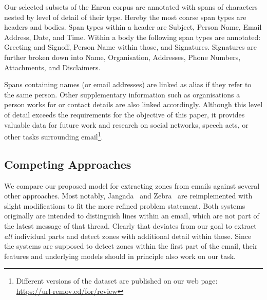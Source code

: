 \documentclass{llncs}
\begin{document}
Our selected subsets of the Enron corpus are annotated with spans of characters nested by level of detail of their type.
Hereby the most coarse span types are headers and bodies.
Span types within a header are Subject, Person Name, Email Address, Date, and Time.
Within a body the following span types are annotated: Greeting and Signoff, Person Name within those, and Signatures. Signatures are further broken down into Name, Organisation, Addresses, Phone Numbers, Attachments, and Disclaimers.

Spans containing names (or email addresses) are linked as alias if they refer to the same person.
Other supplementary information such as organisations a person works for or contact details are also linked accordingly.
Although this level of detail exceeds the requirements for the objective of this paper, it provides valuable data for future work and research on social networks, speech acts, or other tasks surrounding email\footnote{Different versions of the dataset are published on our web page:\\ \url{https://url-remov.ed/for/review}}.




\subsection{Competing Approaches}
We compare our proposed model for extracting zones from emails against several other approaches.
Most notably, Jangada~\cite{signature} and Zebra~\cite{zones} are reimplemented with slight modifications to fit the more refined problem statement.
Both systems originally are intended to distinguish lines within an email, which are not part of the latest message of that thread.
Clearly that deviates from our goal to extract \textit{all} individual parts and detect zones with additional detail within those.
Since the systems are supposed to detect zones within the first part of the email, their features and underlying models should in principle also work on our task.
\end{document}
